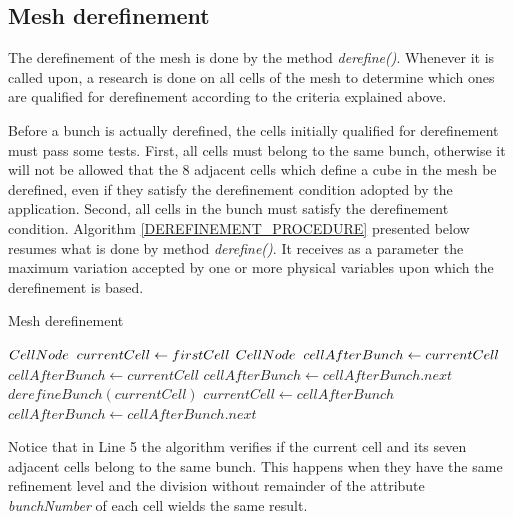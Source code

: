 \subsection{Mesh derefinement}
The derefinement of the mesh is done by the method
\textit{derefine()}. Whenever it is called upon, a research is done
on all cells of the mesh to determine which ones are qualified for
derefinement according to the criteria explained above.

Before a bunch is actually derefined, the cells initially qualified
for derefinement must pass some tests. First, all cells must belong
to the same bunch, otherwise it will not be allowed that the $8$
adjacent cells which define a cube in the mesh be derefined, even if
they satisfy the derefinement condition adopted by the application.
Second, all cells in the bunch must satisfy the derefinement
condition. Algorithm \ref{DEREFINEMENT_PROCEDURE} presented below
resumes what is done by method \textit{derefine()}. It receives as a
parameter the maximum variation accepted by one or more physical
variables upon which the derefinement is based.

\begin{algorithm}[!ht]
    \caption{Mesh derefinement}
    \small{
    \begin{algorithmic}[1]
        \State $CellNode \hspace{2mm} currentCell \gets firstCell$
        \State $CellNode \hspace{2mm} cellAfterBunch \gets currentCell$
                    \State$cellAfterBunch \gets currentCell$
                         \State $cellAfterBunch \gets cellAfterBunch.next$
                     \EndFor
                    \State $derefineBunch(currentCell)$
                \EndIf
            \EndIf
            \State$currentCell \gets cellAfterBunch$
                \State$cellAfterBunch \gets cellAfterBunch.next$
            \EndIf
        \EndWhile
    \EndProcedure
    \end{algorithmic}
    }
    \label{DEREFINEMENT_PROCEDURE}
\end{algorithm}

Notice that in Line 5 the algorithm verifies if the current cell and
its seven adjacent cells belong to the same bunch. This happens when
they have the same refinement level and the division without
remainder of the attribute \textit{bunchNumber} of each cell wields
the same result.

